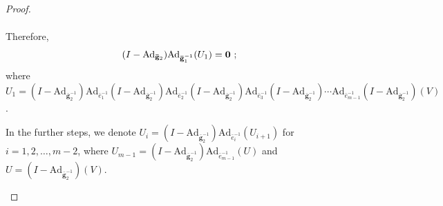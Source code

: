 \documentclass[10pt,twoside]{amsart}
\theoremstyle{definition}
\theoremstyle{definition}
\begin{document}
\begin{proof}
\begin{enumerate}
\begin{eqnarray*}
\end{eqnarray*}
\noindent Therefore, 
\begin{equation}{\label{eqmain1}}
(I-\mathrm{Ad}_{\mathbf{\bar g}_2})\mathrm{Ad}_{\mathbf{\bar g}_1^{-1}}(U_1)=\mathbf{0}\ ;
\end{equation}
where $U_1 = (I-\mathrm{Ad}_{\mathbf{\bar g}_2^{-1}})\mathrm{Ad}_{\bar e_1^{-1}}(I-\mathrm{Ad}_{\mathbf{\bar g}_2^{-1}})\mathrm{Ad}_{\bar e_2^{-1}}(I-\mathrm{Ad}_{\mathbf{\bar g}_2^{-1}})\mathrm{Ad}_{\bar e_3^{-1}}(I-\mathrm{Ad}_{\mathbf{\bar g}_2^{-1}})\cdots \mathrm{Ad}_{\bar e_{m-1}^{-1}}(I-\mathrm{Ad}_{\mathbf{\bar g}_2^{-1}})(V)$. 
    
\noindent In the further steps, we denote $U_i=(I-\mathrm{Ad}_{\mathbf{\bar g}_2^{-1}})\mathrm{Ad}_{\bar e_i^{-1}}(U_{i+1})$ for $i=1, 2, \ldots, m-2$, where $U_{m-1}=(I- \mathrm{Ad}_{\mathbf{\bar g}_2^{-1}}) \mathrm{Ad}_{\bar e_{m-1}^{-1}}(U)$ and $U=(I - \mathrm{Ad}_{\mathbf{\bar g}_2^{-1}})(V)$.



\end{enumerate}
\end{proof}
\end{document}
